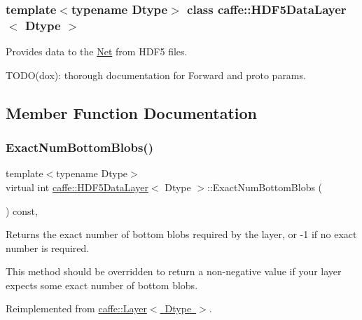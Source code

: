 \subsubsection*{template$<$typename Dtype$>$\newline
class caffe\+::\+H\+D\+F5\+Data\+Layer$<$ Dtype $>$}

Provides data to the \mbox{\hyperlink{classcaffe_1_1_net}{Net}} from H\+D\+F5 files. 

T\+O\+D\+O(dox)\+: thorough documentation for Forward and proto params. 

\subsection{Member Function Documentation}
\mbox{\label{classcaffe_1_1_h_d_f5_data_layer_a4eb72974cea32c84acb6b8012a0d326b}} 
\subsubsection{\texorpdfstring{Exact\+Num\+Bottom\+Blobs()}{ExactNumBottomBlobs()}\hspace{0.1cm}{\footnotesize\ttfamily [1/2]}}
{\footnotesize\ttfamily template$<$typename Dtype$>$ \\
virtual int \mbox{\hyperlink{classcaffe_1_1_h_d_f5_data_layer}{caffe\+::\+H\+D\+F5\+Data\+Layer}}$<$ Dtype $>$\+::Exact\+Num\+Bottom\+Blobs (\begin{DoxyParamCaption}{ }\end{DoxyParamCaption}) const\hspace{0.3cm}{\ttfamily [inline]}, {\ttfamily [virtual]}}



Returns the exact number of bottom blobs required by the layer, or -\/1 if no exact number is required. 

This method should be overridden to return a non-\/negative value if your layer expects some exact number of bottom blobs. 

Reimplemented from \mbox{\hyperlink{classcaffe_1_1_layer_a8e5ee0494d85f5f55fc4396537cbc60f}{caffe\+::\+Layer$<$ Dtype $>$}}.

\mbox{\label{classcaffe_1_1_h_d_f5_data_layer_a4eb72974cea32c84acb6b8012a0d326b}} 
